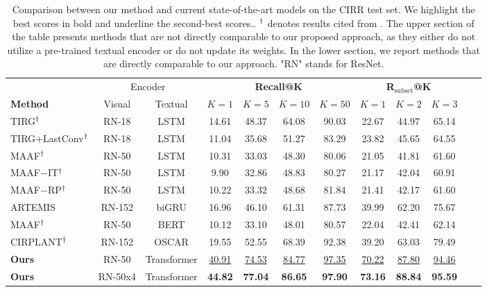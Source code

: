 \documentclass[acmlarge]{acmart}
\begin{document}
\begin{table}[t]
\centering
\begin{tabular}{lcccc  cccc ccc}
  \toprule
& \multicolumn{2}{c}{Encoder} &\multicolumn{4}{c}{\textbf{Recall@K}} & \multicolumn{3}{c}{\textbf{R$_\text{subset}$@K}} \\
\cmidrule(lr){2-3}
\cmidrule(lr){4-7}
\cmidrule(lr){8-10}
\textbf{Method} & Visual & Textual & $K=1$ & $K=5$ &  $K=10$ & $K=50$ &  $K=1$ & $K=2$ &  $K=3$ \\
\midrule
TIRG$\textsuperscript{\dag}$ \cite{vo2019composing} & RN-18 & LSTM & 14.61 & 48.37 & 64.08 & 90.03 & 22.67 & 44.97 & 65.14   \\
TIRG$+$LastConv$\textsuperscript{\dag}$ \cite{vo2019composing} & RN-18 & LSTM & 11.04 & 35.68 & 51.27 & 83.29 & 23.82 & 45.65 & 64.55   \\ 
MAAF$\textsuperscript{\dag}$ \cite{dodds2020modality} & RN-50 & LSTM & 10.31 & 33.03 & 48.30 & 80.06 & 21.05 & 41.81 & 61.60 \\ 
MAAF$-$IT$\textsuperscript{\dag}$ \cite{dodds2020modality} & RN-50 & LSTM & 9.90 & 32.86 & 48.83 & 80.27 & 21.17 & 42.04 & 60.91 \\ 
MAAF$-$RP$\textsuperscript{\dag}$ \cite{dodds2020modality} & RN-50 & LSTM & 10.22 & 33.32 & 48.68 & 81.84 & 21.41 & 42.17 & 61.60 \\ 
ARTEMIS \cite{delmas2021artemis} & RN-152 & biGRU & 16.96 & 46.10 & 61.31 & 87.73 & 39.99 & 62.20 & 75.67 \\ \midrule[.02em]
MAAF$\textsuperscript{\dag}$ \cite{dodds2020modality} & RN-50 & BERT & 10.12 & 33.10 & 48.01 & 80.57 & 22.04 & 42.41 & 62.14 \\
CIRPLANT$\textsuperscript{\dag}$ \cite{liu2021image} & RN-152 & OSCAR & 19.55 & 52.55 & 68.39 & 92.38 & 39.20 & 63.03 & 79.49 \\
\rowcolor{LightCyan}
\textbf{Ours} & RN-50 & Transformer & \underline{40.91} & \underline{74.53} & \underline{84.77} & \underline{97.35} & \underline{70.22} & \underline{87.80} & \underline{94.46} \\ 
\rowcolor{LightCyan}
\textbf{Ours} & RN-50x4 & Transformer & \textbf{44.82} & \textbf{77.04} & \textbf{86.65} & \textbf{97.90} & \textbf{73.16} & \textbf{88.84} & \textbf{95.59}\\ \bottomrule
\end{tabular}
\caption{Comparison between our method and current state-of-the-art models on the CIRR test set. We highlight the best scores in bold and underline the second-best scores.. $\textsuperscript{\dag}$ denotes results cited from \cite{liu2021image}. The upper section of the table presents methods that are not directly comparable to our proposed approach, as they either do not utilize a pre-trained textual encoder or do not update its weights. In the lower section, we report methods that are directly comparable to our approach. "RN" stands for ResNet.}
\label{tab:cirr-comparison}
\vspace{-4ex}
\end{table}
\end{document}
